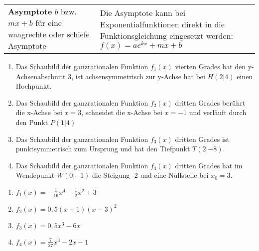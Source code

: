 \begin{tabular}{p{}|p{}}
	\hline
	\textbf{Asymptote} \(b\) bzw.\newline\(mx+b\) für eine waagrechte oder schiefe Asymptote&\textcolor{loes}{Die Asymptote kann bei Exponentialfunktionen direkt in die Funktionsgleichung eingesetzt werden: \(f(x)=ae^{kx}+mx+b\)}\newline\newline\newline\newline
\end{tabular}
\newpage
\begin{Exercise}[title={\raggedright Bestimme jeweils die Funktionsgleichung.}, label=fktbestimmenA1]
	\begin{enumerate}[label=\alph*)]
		\item Das Schaubild der ganzrationalen Funktion \(f_1(x)\) vierten Grades hat den y-Achsenabschnitt 3, ist achsensymmetrisch zur y-Achse hat bei \(H(2|4)\) einen Hochpunkt.
		\item Das Schaubild der ganzrationalen Funktion \(f_2(x)\) dritten Grades berührt die x-Achse bei \(x=3\), schneidet die x-Achse bei \(x=-1\) und verläuft durch den Punkt \(P(1|4)\)
		\item Das Schaubild der ganzrationalen Funktion \(f_3(x)\) dritten Grades ist punktsymmetrisch zum Ursprung und hat den Tiefpunkt \(T(2|-8)\).
		\item Das Schaubild der ganzrationalen Funktion \(f_4(x)\) dritten Grades hat im Wendepunkt \(W(0|-1)\) die Steigung -2 und eine Nullstelle bei \(x_0=3\).
	\end{enumerate}
\end{Exercise}
\begin{Answer}[ref=fktbestimmenA1]
	\begin{enumerate}[label=\alph*)]
		\item \(f_1(x)=-\frac{1}{16}x^4+\frac{1}{2}x^2+3\)
		\item \(f_2(x)=0,5(x+1)(x-3)^2\)
		\item \(f_3(x)=0,5x^3-6x\)
		\item \(f_4(x)=\frac{7}{27}x^3-2x-1\)
	\end{enumerate}
\end{Answer}

